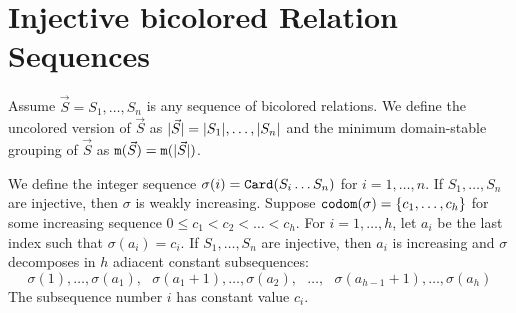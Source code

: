 \documentclass{lmcs}
\begin{document}
\newpage   \section{Injective bicolored Relation Sequences}

Assume $\vec{S} = S_1, \ldots, S_n$ is any sequence of bicolored relations. We define
the uncolored version of $\vec{S}$ as ${| \vec{S} |} = {| S_1 |}, \ldots, 
{| S_n |}$ and the minimum domain-stable grouping of $\vec{S}$ as
${\tt m}(\vec{S}) = {\tt m}({| \vec{S} |})$.

We define the integer sequence $\sigma(i) = {\tt Card}(S_i \ldots S_n)$ for $i=1, \ldots, n$.
If $S_1, \ldots, S_n$ are injective,  then $\sigma$ is weakly increasing.
Suppose ${\tt codom}(\sigma) = \{c_1, \ldots, c_h\}$ for some increasing sequence 
$0 \le c_1 < c_2 < \ldots < c_h$. For $i=1, \ldots, h$, let $a_i$ be the last index such that
$ \sigma(a_i) = c_i$. If $S_1, \ldots, S_n$ are injective, then $a_i$ is increasing
and $\sigma$ decomposes in $h$ adiacent constant subsequences:
$$
\sigma(1), \ldots, \sigma(a_1),
\ \ \
\sigma(a_1+1), \ldots, \sigma(a_2),
\ \ \ 
\ldots,
\ \ \
\sigma(a_{h-1}+1), \ldots, \sigma(a_h)
$$ 
The subsequence number $i$ has constant value $c_i$.



\end{document}
